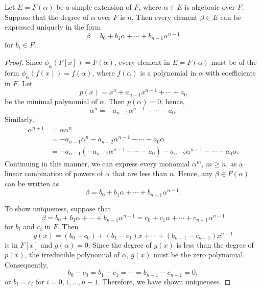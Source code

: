 \begin{theorem}\label{fields:simple_ext_theorem}
Let $E = F( \alpha )$ be a simple extension of $F$, where $\alpha \in
E$ is algebraic over $F$.  Suppose that the degree of $\alpha$ over $F$
is $n$. Then every element $\beta \in E$ can be expressed uniquely in
the form 
\[
\beta = b_0 + b_1 \alpha + \cdots + b_{n-1} \alpha^{n-1}
\]
for $b_i \in F$.
\end{theorem}
 
 
\begin{proof}
Since $\phi_{\alpha} ( F[x] ) = F( \alpha )$,  every element in $E =
F( \alpha )$ must be of the form $\phi_{\alpha} ( f(x) ) = f( \alpha
)$, where $f(\alpha)$ is a polynomial in $\alpha$ with coefficients in
$F$. Let 
\[
p(x) = x^n + a_{n-1} x^{n-1 } + \cdots + a_0
\]
be the minimal polynomial of $\alpha$. Then $p( \alpha ) = 0$; hence,
\[
{\alpha}^n = - a_{n-1} {\alpha}^{n-1} - \cdots - a_0.
\]
Similarly,
\begin{align*}
{\alpha}^{n+1} & = {\alpha} {\alpha}^n \\
& =
- a_{n-1} {\alpha}^n - a_{n-2} {\alpha}^{n-1} - \cdots - a_0
{\alpha} \\
& =
- a_{n-1}( - a_{n-1} {\alpha}^{n-1} - \cdots - a_0    ) -
a_{n-2} {\alpha}^{n-1} - \cdots - a_0 {\alpha}.
\end{align*}
Continuing in this manner, we can express every monomial ${\alpha}^m$,
$m \geq n$, as a linear combination of powers of ${\alpha}$ that are
less than $n$. Hence, any $\beta \in F( \alpha )$ can be written as 
\[
\beta = b_0 + b_1 \alpha + \cdots + b_{n-1} \alpha^{n-1}.
\]
 

To show uniqueness, suppose that
\[
\beta = 
b_0 + b_1 \alpha + \cdots + b_{n-1} \alpha^{n-1} =
c_0 + c_1 \alpha + \cdots + c_{n-1} \alpha^{n-1}
\]
for $b_i$ and $c_i$ in $F$. Then
\[
g(x) 
= 
(b_0 - c_0) + (b_1 - c_1) x + \cdots + (b_{n-1} - c_{n-1})x^{n-1}
\]
is in $F[x]$ and $g( \alpha ) = 0$. Since the degree of $g(x)$ is less
than the degree of $p( x )$, the irreducible polynomial of $\alpha$,
$g(x)$ must be the zero polynomial. Consequently, 
\[
b_0 - c_0 = b_1 - c_1 = \cdots = b_{n-1} - c_{n-1} = 0,
\]
or $b_i = c_i$ for $i = 0, 1, \ldots, n-1$.  Therefore, we have shown
uniqueness. 
\end{proof}
  

